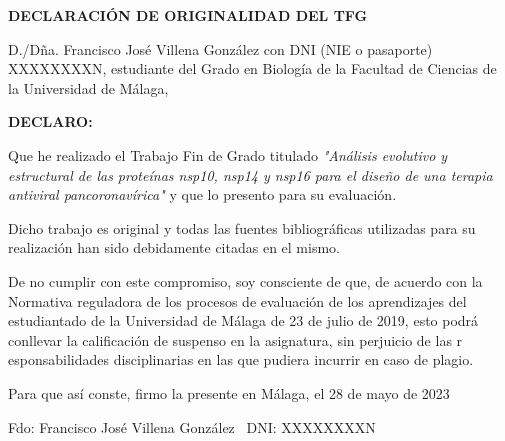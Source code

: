 \begin{center}

\Large\bfseries DECLARACIÓN DE ORIGINALIDAD DEL TFG

\end{center}

\vspace{0.5cm}

D./Dña. Francisco José Villena González con DNI (NIE o pasaporte) XXXXXXXXN, 
estudiante del Grado en Biología de la Facultad de Ciencias de la Universidad 
de Málaga,

\textbf {DECLARO:} 

Que he realizado el Trabajo Fin de Grado titulado \textit{"Análisis evolutivo y 
estructural de las proteínas nsp10, nsp14 y nsp16 para el diseño de una terapia 
antiviral pancoronavírica"} y que lo presento para su evaluación. 
    
Dicho trabajo es original y todas las fuentes bibliográficas utilizadas para su 
realización han sido debidamente citadas en el mismo. 
    
De no cumplir con este compromiso, soy consciente de que, de acuerdo con la 
Normativa reguladora de los procesos de evaluación de los aprendizajes del 
estudiantado de la Universidad de Málaga de 23 de julio de 2019, esto podrá 
conllevar la calificación de suspenso en la asignatura, sin perjuicio de las r
esponsabilidades disciplinarias en las que pudiera incurrir en caso de plagio.
    
Para que así conste, firmo la presente en Málaga, el 28 de mayo de 2023 

\begin{flushright}
Fdo: Francisco José Villena González \
DNI: XXXXXXXXN
\end{flushright}